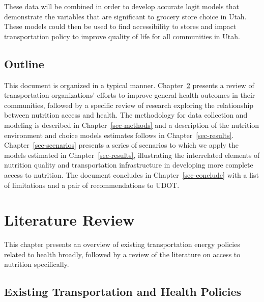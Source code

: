 \documentclass[
  letterpaper,
  DIV=11,
  numbers=noendperiod]{scrreport}
\begin{document}
These data will be combined in order to develop accurate logit models
that demonstrate the variables that are significant to grocery store
choice in Utah. These models could then be used to find accessibility to
stores and impact transportation policy to improve quality of life for
all communities in Utah.

\hypertarget{outline}{%
\section{Outline}\label{outline}}

This document is organized in a typical manner.
Chapter~\ref{sec-literature} presents a review of transportation
organizations' efforts to improve general health outcomes in their
communities, followed by a specific review of research exploring the
relationship between nutrition access and health. The methodology for
data collection and modeling is described in Chapter~\ref{sec-methods}
and a description of the nutrition environment and choice models
estimates follows in Chapter~\ref{sec-results}.
Chapter~\ref{sec-scenarios} presents a series of scenarios to which we
apply the models estimated in Chapter~\ref{sec-results}, illustrating
the interrelated elements of nutrition quality and transportation
infrastructure in developing more complete access to nutrition. The
document concludes in Chapter~\ref{sec-conclude} with a list of
limitations and a pair of recommendations to UDOT.


\hypertarget{sec-literature}{%
\chapter{Literature Review}\label{sec-literature}}

This chapter presents an overview of existing transportation energy
policies related to health broadly, followed by a review of the
literature on access to nutrition specifically.

\hypertarget{existing-transportation-and-health-policies}{%
\section{Existing Transportation and Health
Policies}\label{existing-transportation-and-health-policies}}
\end{document}

